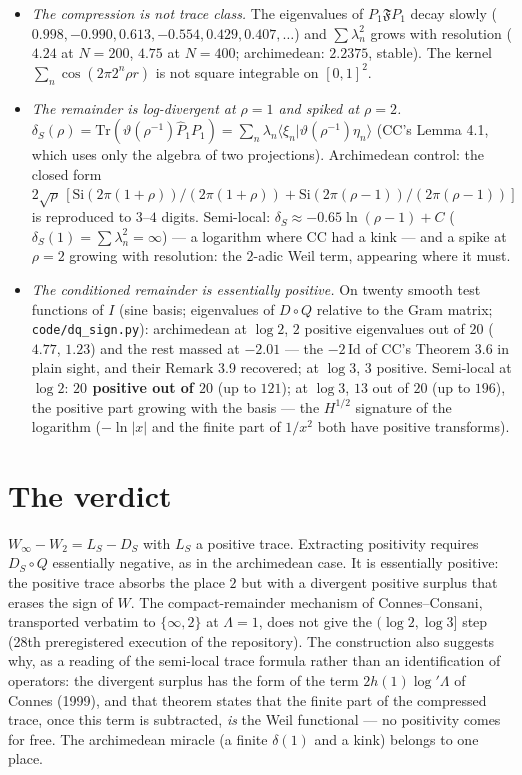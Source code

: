 \documentclass[11pt]{article}
\begin{document}
\begin{itemize}
\item \emph{The compression is not trace class.} The eigenvalues of $P_1\mathfrak FP_1$ decay slowly ($0.998,-0.990,0.613,-0.554,0.429,0.407,\ldots$) and $\sum\lambda_n^2$ grows with resolution ($4.24$ at $N=200$, $4.75$ at $N=400$; archimedean: $2.2375$, stable). The kernel $\sum_n\cos(2\pi2^n\rho r)$ is not square integrable on $[0,1]^2$.
\item \emph{The remainder is log-divergent at $\rho=1$ and spiked at $\rho=2$.} $\delta_S(\rho)=\mathrm{Tr}(\vartheta(\rho^{-1})\hat P_1P_1)=\sum_n\lambda_n\langle\xi_n|\vartheta(\rho^{-1})\eta_n\rangle$ (CC's Lemma 4.1, which uses only the algebra of two projections). Archimedean control: the closed form $2\sqrt\rho\,[\mathrm{Si}(2\pi(1+\rho))/(2\pi(1+\rho))+\mathrm{Si}(2\pi(\rho-1))/(2\pi(\rho-1))]$ is reproduced to $3$--$4$ digits. Semi-local: $\delta_S\approx-0.65\ln(\rho-1)+C$ ($\delta_S(1)=\sum\lambda_n^2=\infty$) --- a logarithm where CC had a kink --- and a spike at $\rho=2$ growing with resolution: the $2$-adic Weil term, appearing where it must.
\item \emph{The conditioned remainder is essentially positive.} On twenty smooth test functions of $I$ (sine basis; eigenvalues of $D\circ Q$ relative to the Gram matrix; \texttt{code/dq\_sign.py}): archimedean at $\log2$, $2$ positive eigenvalues out of $20$ ($4.77$, $1.23$) and the rest massed at $-2.01$ --- the $-2\,\mathrm{Id}$ of CC's Theorem 3.6 in plain sight, and their Remark 3.9 recovered; at $\log3$, $3$ positive. Semi-local at $\log2$: \textbf{$20$ positive out of $20$} (up to $121$); at $\log3$, $13$ out of $20$ (up to $196$), the positive part growing with the basis --- the $H^{1/2}$ signature of the logarithm ($-\ln|x|$ and the finite part of $1/x^2$ both have positive transforms).
\end{itemize}

\section{The verdict}
$W_\infty-W_2=L_S-D_S$ with $L_S$ a positive trace. Extracting positivity requires $D_S\circ Q$ essentially negative, as in the archimedean case. It is essentially positive: the positive trace absorbs the place $2$ but with a divergent positive surplus that erases the sign of $W$. The compact-remainder mechanism of Connes--Consani, transported verbatim to $\{\infty,2\}$ at $\Lambda=1$, does not give the $(\log2,\log3]$ step (28th preregistered execution of the repository). The construction also suggests why, as a reading of the semi-local trace formula rather than an identification of operators: the divergent surplus has the form of the term $2h(1)\log'\Lambda$ of Connes (1999), and that theorem states that the finite part of the compressed trace, once this term is subtracted, \emph{is} the Weil functional --- no positivity comes for free. The archimedean miracle (a finite $\delta(1)$ and a kink) belongs to one place.
\end{document}
